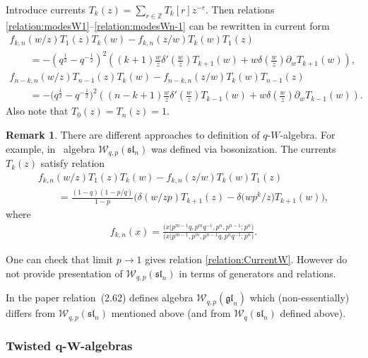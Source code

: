 \documentclass[pdftex]{sigma}
\numberwithin{equation}{section}
\theoremstyle{definition}
\newtheorem{Remark}[Theorem]{Remark}
\newcommand{\half}{\frac{1}{2}}
\newcommand{ \W }{ \mathcal{W}_{q} ( \mathfrak{sl}_n ) }
\begin{document}
Introduce currents $T_k (z) = \sum\limits_{r \in \mathbb{Z} } T_k[r] z^{-r}$. Then relations \eqref{relation:modesW1}--\eqref{relation:modesWn-1} can be rewritten in current form
\begin{gather}
f_{k,n} (w/z) T_1(z) T_k (w) - f_{k,n}(z/w) T_k(w) T_1 (z) \nonumber\\
\qquad{}= -(q^{\half}-q^{-\half})^2 \left( (k+1) \frac{w}{z} \delta' \left(\frac{w}{z}\right) T_{k+1} (w) + w \delta\left(\frac{w}{z}\right) \partial_w T_{k+1} (w) \right), \label{relation:CurrentW}
\\
f_{n-k,n} (w/z) T_{n-1}(z) T_k (w) - f_{n-k,n}(z/w) T_k(w) T_{n-1} (z) \nonumber\\
\qquad{} =-\big(q^{\half}-q^{-\half}\big)^2 \left( (n-k+1) \frac{w}{z} \delta' \left(\frac{w}{z}\right) T_{k-1} (w) + w \delta\left(\frac{w}{z}\right) \partial_w T_{k-1} (w) \right). \label{relation:CurrentWn-1}
\end{gather}
Also note that $T_0(z)=T_n(z)=1$.
\begin{Remark}
There are different approaches to definition of $q$-${W}$-algebra. For example, in~\cite{FF} algebra $\mathcal{W}_{q,p} ( \mathfrak{sl}_n )$ was defined via bosonization. The currents $T_k(z)$ satisfy relation \cite[Theorem~2]{FF}
\begin{gather*}
f_{k,n} (w/z) T_1(z) T_k (w) - f_{k,n}(z/w)T_k(w) T_1 (z) \\
\qquad{} = \frac{(1-q)(1-p/q)}{1-p} \big( \delta(w/zp) T_{k+1}(z) - \delta\big(wp^k/z\big) T_{k+1} (w) \big),
\end{gather*}
where
\begin{gather*}
f_{k, n} (x)= \frac{\big(x| p^{m-1} q, p^m q^{-1}, p^n, p^{n-1}; p^n\big)}{\big(x| p^{m-1}, p^m, p^{n-1} q, p^n q^{-1}; p^n\big)}.
\end{gather*}

One can check that limit $p \rightarrow 1$ gives relation \eqref{relation:CurrentW}. However \cite{FF} do not provide presentation of $\mathcal{W}_{q,p} ( \mathfrak{sl}_n )$ in terms of generators and relations.

In the paper \cite{N16} relation~(2.62) defines algebra $\mathcal{W}_{q,p} ( \mathfrak{gl}_n)$ which (non-essentially) differs from $\mathcal{W}_{q,p} (\mathfrak{sl}_n )$ mentioned above (and from $\W$ defined above).
\end{Remark}

\subsubsection[Twisted $q$-$W$-algebras]{Twisted $\boldsymbol{q}$-$\boldsymbol{W}$-algebras}
\end{document}
